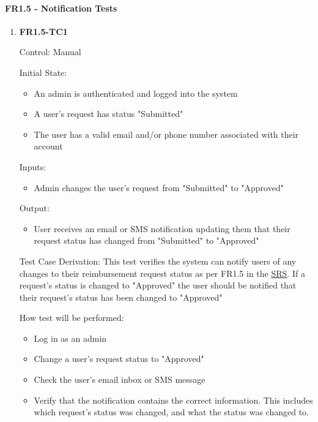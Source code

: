 \documentclass[12pt, titlepage]{article}
\begin{document}
\paragraph{FR1.5 - Notification Tests}

\begin{enumerate}
    \item{\textbf{FR1.5-TC1}}
    
    Control: Manual
    
    Initial State:
    \begin{itemize}
        \item An admin is authenticated and logged into the system
        \item A user's request has status "Submitted"
        \item The user has a valid email and/or phone number associated with their account
    \end{itemize}
    
    Inputs: 
    \begin{itemize}
        \item Admin changes the user's request from "Submitted" to "Approved"
    \end{itemize}
    
    Output: 
    \begin{itemize}
        \item User receives an email or SMS notification updating them that their request status has changed from "Submitted" to "Approved"
    \end{itemize}
    
    Test Case Derivation: This test verifies the system can notify users of any changes to their reimbursement request status as per FR1.5 in the \href{https://shorturl.at/FdAgR}{SRS}. If a request's status is changed to "Approved" the user should be notified that their request's status has been changed to "Approved"
    
    How test will be performed:
    \begin{itemize}
        \item Log in as an admin
        \item Change a user's request status to "Approved"
        \item Check the user's email inbox or SMS message
        \item Verify that the notification contains the correct information. This includes which request's status was changed, and what the status was changed to.
    \end{itemize}
\end{enumerate}
\end{document}
